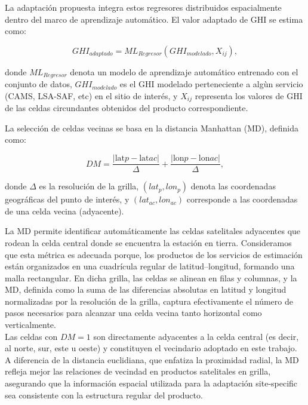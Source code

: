 La adaptación propuesta integra estos regresores distribuidos espacialmente dentro del marco de aprendizaje automático. El valor adaptado de GHI se estima como:

\begin{equation}
GHI_{adaptado} = ML_{Regresor}(GHI_{modelado}, X_{ij}),
\label{ec:SiteAdap}
\end{equation}

\noindent donde $ML_{Regresor}$ denota un modelo de aprendizaje automático entrenado con el conjunto de datos, $GHI_{modelado}$ es el GHI modelado perteneciente a algùn servicio (CAMS, LSA-SAF, etc) en el sitio de interés, y $X_{ij}$ representa los valores de GHI de las celdas circundantes obtenidos del producto correspondiente.

La selección de celdas vecinas se basa en la distancia Manhattan (MD), definida como:

\begin{equation}
DM = \frac{|\text{lat}p - \text{lat}{ac}|}{\Delta} + \frac{|\text{lon}p - \text{lon}{ac}|}{\Delta},
\label{ec:dist}
\end{equation}

\noindent donde $\Delta$ es la resolución de la grilla, $(lat_{p}, lon_{p})$ denota las coordenadas geográficas del punto de interés, y $(lat_{ac}, lon_{ac})$ corresponde a las coordenadas de una celda vecina (adyacente).

La MD permite identificar automáticamente las celdas satelitales adyacentes que rodean la celda central donde se encuentra la estación en tierra. Consideramos que esta métrica es adecuada porque, los productos de los servicios de estimación están organizados en una cuadrícula regular de latitud–longitud, formando una malla rectangular. En dicha grilla, las celdas se alinean en filas y columnas, y la MD, definida como la suma de las diferencias absolutas en latitud y longitud normalizadas por la resolución de la grilla, captura efectivamente el número de pasos necesarios para alcanzar una celda vecina tanto horizontal como verticalmente.\\

Las celdas con $DM=1$ son directamente adyacentes a la celda central (es decir, al norte, sur, este u oeste) y constituyen el vecindario adoptado en este trabajo. A diferencia de la distancia euclidiana, que enfatiza la proximidad radial, la MD refleja mejor las relaciones de vecindad en productos satelitales en grilla, asegurando que la información espacial utilizada para la adaptación site-specific sea consistente con la estructura regular del producto.\\

